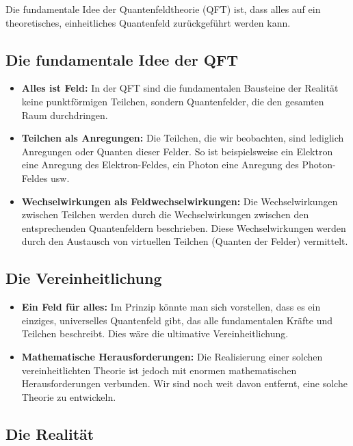 \documentclass{article}
\begin{document}
Die fundamentale Idee der Quantenfeldtheorie (QFT) ist, dass alles auf ein theoretisches, einheitliches Quantenfeld zurückgeführt werden kann.

\subsection{Die fundamentale Idee der QFT}

\begin{itemize}
	\item \textbf{Alles ist Feld:} In der QFT sind die fundamentalen Bausteine der Realität keine punktförmigen Teilchen, sondern Quantenfelder, die den gesamten Raum durchdringen.
	\item \textbf{Teilchen als Anregungen:} Die Teilchen, die wir beobachten, sind lediglich Anregungen oder Quanten dieser Felder. So ist beispielsweise ein Elektron eine Anregung des Elektron-Feldes, ein Photon eine Anregung des Photon-Feldes usw.
	\item \textbf{Wechselwirkungen als Feldwechselwirkungen:} Die Wechselwirkungen zwischen Teilchen werden durch die Wechselwirkungen zwischen den entsprechenden Quantenfeldern beschrieben. Diese Wechselwirkungen werden durch den Austausch von virtuellen Teilchen (Quanten der Felder) vermittelt.
\end{itemize}

\subsection{Die Vereinheitlichung}

\begin{itemize}
	\item \textbf{Ein Feld für alles:} Im Prinzip könnte man sich vorstellen, dass es ein einziges, universelles Quantenfeld gibt, das alle fundamentalen Kräfte und Teilchen beschreibt. Dies wäre die ultimative Vereinheitlichung.
	\item \textbf{Mathematische Herausforderungen:} Die Realisierung einer solchen vereinheitlichten Theorie ist jedoch mit enormen mathematischen Herausforderungen verbunden. Wir sind noch weit davon entfernt, eine solche Theorie zu entwickeln.
\end{itemize}

\subsection{Die Realität}
\end{document}
